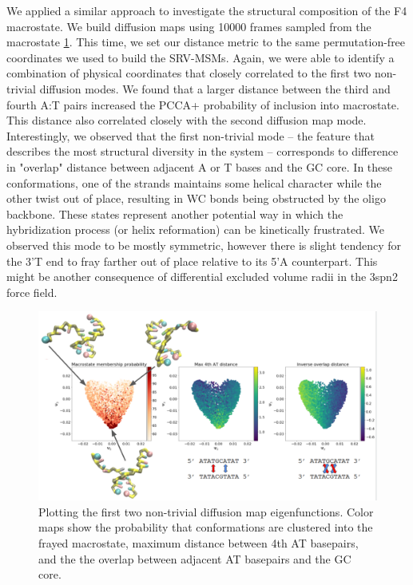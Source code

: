 \documentclass[journal=jpcbfk,manuscript=article]{achemso}
\begin{document}
We applied a similar approach to investigate the structural composition of the F4 macrostate. We build diffusion maps using 10000 frames sampled from the macrostate \ref{fig:GC-core_dmaps}. This time, we set our distance metric to the same permutation-free coordinates we used to build the SRV-MSMs. Again, we were able to identify a combination of physical coordinates that closely correlated to the first two non-trivial diffusion modes. We found that a larger distance between the third and fourth A:T pairs increased the PCCA+ probability of inclusion into macrostate. This distance also correlated closely with the second diffusion map mode. Interestingly, we observed that the first non-trivial mode -- the feature that describes the most structural diversity in the system -- corresponds to difference in "overlap" distance between adjacent A or T bases and the GC core. In these conformations, one of the strands maintains some helical character while the other twist out of place, resulting in WC bonds being obstructed by the oligo backbone. These states represent another potential way in which the hybridization process (or helix reformation) can be kinetically frustrated. We observed this mode to be mostly symmetric, however there is slight tendency for the 3'T end to fray farther out of place relative to its 5'A counterpart. This might be another consequence of differential excluded volume radii in the 3spn2 force field.

\begin{figure}[ht!]
	\begin{center}
        \includegraphics[width=\textwidth]{Figs/figs_imp/GC-core_dmaps.png}
        \caption{Plotting the first two non-trivial diffusion map eigenfunctions. Color maps show the probability that conformations are clustered into the frayed macrostate, maximum distance between 4th AT basepairs, and the the overlap between adjacent AT basepairs and the GC core.}
        \label{fig:GC-core_dmaps}
	\end{center}
\end{figure}
\end{document}
